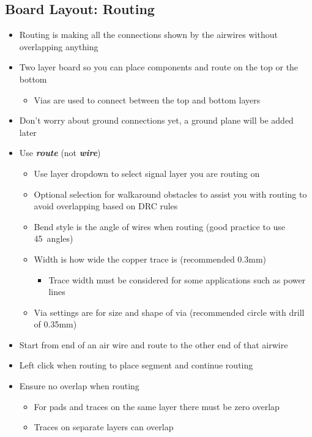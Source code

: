 \documentclass{article}
\begin{document}
\subsection{Board Layout: Routing}
\begin{itemize}
    \item Routing is making all the connections shown by the airwires without overlapping anything
    \item Two layer board so you can place components and route on the top or the bottom
    \begin{itemize}
        \item Vias are used to connect between the top and bottom layers
    \end{itemize}
    \item Don't worry about ground connections yet, a ground plane will be added later
    \item Use \textit{\textbf{route}} (not \textit{\textbf{wire}})
    \begin{itemize}
        \item Use layer dropdown to select signal layer you are routing on
        \item Optional selection for walkaround obstacles to assist you with routing to avoid overlapping based on DRC rules
        \item Bend style is the angle of wires when routing (good practice to use 45\degree\ angles)
        \item Width is how wide the copper trace is (recommended 0.3mm)
        \begin{itemize}
            \item Trace width must be considered for some applications such as power lines
        \end{itemize}
        \item Via settings are for size and shape of via (recommended circle with drill of 0.35mm)
    \end{itemize}
    \item Start from end of an air wire and route to the other end of that airwire
    \item Left click when routing to place segment and continue routing
    \item Ensure no overlap when routing
    \begin{itemize}
        \item For pads and traces on the same layer there must be zero overlap
        \item Traces on separate layers can overlap

\end{itemize}
\end{itemize}
\end{document}
